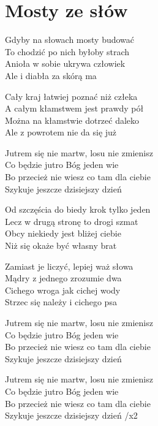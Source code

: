 \section{Mosty ze słów}
\begin{text}
Gdyby na słowach mosty budować\\
To chodzić po nich byłoby strach\\
Anioła w sobie ukrywa człowiek\\
Ale i diabła za skórą ma

Cały kraj łatwiej poznać niż człeka\\
A całym kłamstwem jest prawdy pół\\
Można na kłamstwie dotrzeć daleko\\
Ale z powrotem nie da się już

Jutrem się nie martw, losu nie zmienisz\\
Co będzie jutro Bóg jeden wie\\
Bo przecież nie wiesz co tam dla ciebie\\
Szykuje jeszcze dzisiejszy dzień

Od szczęścia do biedy krok tylko jeden\\
Lecz w drugą stronę to drogi szmat\\
Obcy niekiedy jest bliżej ciebie\\
Niż się okaże być własny brat

Zamiast je liczyć, lepiej waż słowa\\
Mądry z jednego zrozumie dwa\\
Cichego wroga jak cichej wody\\
Strzec się należy i cichego psa

Jutrem się nie martw, losu nie zmienisz\\
Co będzie jutro Bóg jeden wie\\
Bo przecież nie wiesz co tam dla ciebie\\
Szykuje jeszcze dzisiejszy dzień

Jutrem się nie martw, losu nie zmienisz\\
Co będzie jutro Bóg jeden wie\\
Bo przecież nie wiesz co tam dla ciebie\\
Szykuje jeszcze dzisiejszy dzień /x2
\end{text}